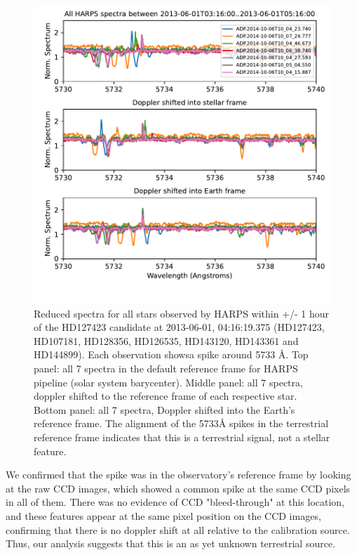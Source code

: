 \documentclass[twocolumn]{aastex701}
\begin{document}
\begin{figure}
    \centering
    \includegraphics[width=\textwidth]{clean-figures/stellarframespectra.pdf}
    \caption{Reduced spectra for all stars observed by HARPS within +/- 1 hour of the HD127423 candidate at 2013-06-01, 04:16:19.375 (HD127423, HD107181, HD128356, HD126535, HD143120, HD143361 and HD144899).  Each observation showsa spike around 5733 \AA. Top panel: all 7 spectra in the default reference frame for HARPS pipeline (solar system barycenter). Middle panel: all 7 spectra, doppler shifted to the reference frame of each respective star. Bottom panel: all 7 spectra, Doppler shifted into the Earth's reference frame.  The alignment of the 5733{\AA} spikes in the terrestrial reference frame indicates that this is a terrestrial signal, not a stellar feature.}
    \label{fig:stellarframespectra}
\end{figure}

 We confirmed that the spike was in the observatory's reference frame by looking at the raw CCD images, which showed a common spike at the same CCD pixels in all of them.  There was no evidence of CCD "bleed-through" at this location, and these features appear at the same pixel position on the CCD images, confirming that there is no doppler shift at all relative to the calibration source. Thus, our analysis suggests that this is an as yet unknown terrestrial source.
\end{document}
